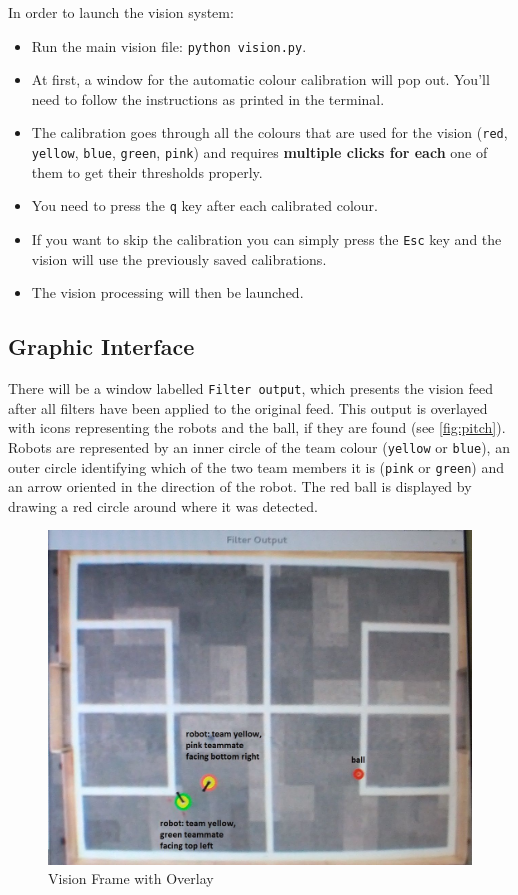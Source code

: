 In order to launch the vision system:
\begin{itemize}
\item Run the main vision file: \texttt{python vision.py}.
\item At first, a window for the automatic colour calibration will pop out. You'll need to follow the instructions as printed in the terminal. 
\item The calibration goes through all the colours that are used for the vision (\texttt{red}, \texttt{yellow}, \texttt{blue}, \texttt{green}, \texttt{pink}) and requires \textbf{multiple clicks for each} one of them to get their thresholds properly.
\item You need to press the \texttt{q} key after each calibrated colour. 
\item If you want to skip the calibration you can simply press the \texttt{Esc} key and the vision will use the previously saved calibrations.
\item The vision processing will then be launched.
\end{itemize}

\subsection{Graphic Interface}
There will be a window labelled \texttt{Filter output}, which presents the vision feed after all filters have been applied to the original feed. This output is overlayed with icons representing the robots and the ball, if they are found (see \autoref{fig:pitch}). Robots are represented by an inner circle of the team colour (\texttt{yellow} or \texttt{blue}), an outer circle identifying which of the two team members it is (\texttt{pink} or \texttt{green}) and an arrow oriented in the direction of the robot.  The red ball is displayed by drawing a red circle around where it was detected. 

\begin{figure}[H]
\centering
\includegraphics[scale=0.2]{vision_pitch}
\caption{Vision Frame with Overlay}
\label{fig:pitch}
\end{figure}

